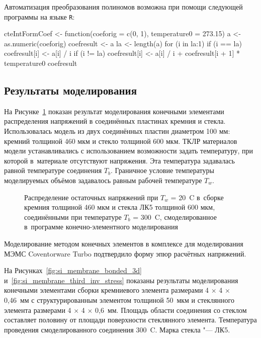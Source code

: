Автоматизация преобразования полиномов возможна
при помощи следующей программы на языке \verb|R|:
\begin{Verb}
cteIntFormCoef <-
  function(coeforig = c(0, 1),
           temperature0 = 273.15) {
    a <- as.numeric(coeforig)
    coefresult <- a
    la <- length(a)
    for (i in la:1) {
      if (i == la)
        coefresult[i] <- a[i] / i
      if (i != la)
        coefresult[i] <- a[i] / i + coefresult[i + 1] * temperature0
    }
    coefresult
  }
\end{Verb}

\subsection{Результаты моделирования}

На Рисунке~\ref{fig:stressX_distrib} показан результат моделирования конечными
элементами распределения напряжений в соединённых пластинах кремния и стекла.
Использовалась модель из двух соединённых пластин диаметром 100 мм:
кремний толщиной 460 мкм и стекло толщиной 600 мкм.
ТКЛР материалов модели устанавливались с использованием возможности задать
температуру, при которой в~материале отсутствуют напряжения.
Эта температура задавалась равной температуре соединения $T_b$.
Граничное условие температуры моделируемых объёмов задавалось равным рабочей температуре $T_w$.

\begin{figure}[!hbt]
    \centering

    \caption{Распределение остаточных напряжений
    при $T_w$ = 20~{\textdegree}C  в~сборке
    кремния толщиной 460 мкм и стекла ЛК5 толщиной 600 мкм,
    соединёнными при температуре $T_b$ = 300~{\textdegree}C, смоделированное
    в~программе конечно-элементного моделирования}
    \label{fig:stressX_distrib}
\end{figure}

Моделирование методом конечных элементов в комплексе для моделирования МЭМС
Coventorware Turbo подтвердило форму эпюр расчётных напряжений.

На Рисунках~\ref{fig:si_membrane_bonded_3d}
и~\ref{fig:si_membrane_third_inv_stress} показаны результаты  моделирования
конечными элементами сборки кремниевого элемента размерами
4\(\,\times\,\)4\(\,\times\,\)0,46~мм с структурированным элементом толщиной 50~мкм
и стеклянного элемента размерами
4\(\,\times\,\)4\(\,\times\,\)0,6~мм. Площадь области соединения со стеклом
составляет половину от площади поверхности стеклянного элемента. Температура
проведения смоделированного соединения 300~{\textdegree}C. Марка стекла "---
ЛК5.

